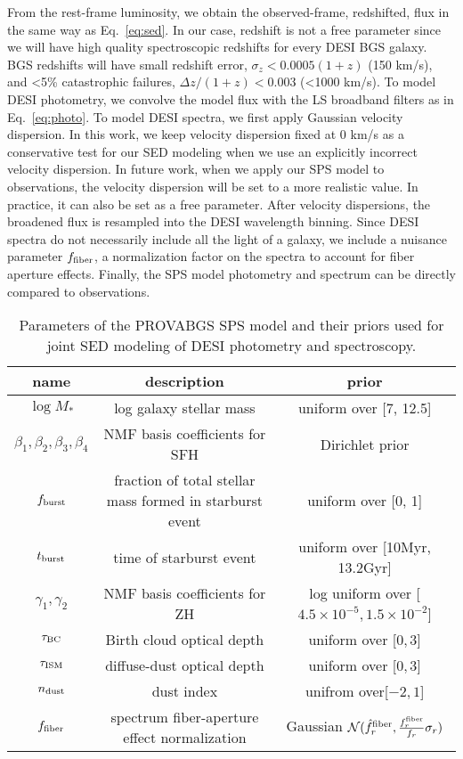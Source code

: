 From the rest-frame luminosity, we obtain the observed-frame, redshifted, flux
in the same way as Eq.~\ref{eq:sed}.
In our case, redshift is not a free parameter since we will have high quality
spectroscopic redshifts for every DESI BGS galaxy.
BGS redshifts will have small redshift error, $\sigma_z < 0.0005 (1+z)$
(150 km/s), and <5\% catastrophic failures, $\Delta z/(1+z) < 0.003$ (<1000
km/s).
To model DESI photometry, we convolve the model flux with the LS broadband
filters as in Eq.~\ref{eq:photo}.
To model DESI spectra, we first apply Gaussian velocity dispersion. 
In this work, we keep velocity dispersion fixed at 0 km/s as a conservative
test for our SED modeling when we use an explicitly incorrect velocity
dispersion.
In future work, when we apply our SPS model to observations, the velocity
dispersion will be set to a more realistic value. 
In practice, it can also be set as a free parameter.
After velocity dispersions, the broadened flux is resampled into the DESI
wavelength binning.  
Since DESI spectra do not necessarily include all the light of a galaxy, we
include a nuisance parameter $f_{\rm fiber}$, a normalization factor on the
spectra to account for fiber aperture effects. 
Finally, the SPS model photometry and spectrum can be directly compared to
observations.

\begin{table} 
\caption{Parameters of the PROVABGS SPS model and their priors used for joint
    SED modeling of DESI photometry and spectroscopy.} 
\begin{center}
    \begin{tabular}{ccc} \toprule
        name & description & prior \\[3pt]
        \hline 
        $\log M_*$                              & log galaxy stellar mass & uniform over [7, 12.5] \\
        $\beta_1, \beta_2, \beta_3, \beta_4$    & NMF basis coefficients for SFH & Dirichlet prior \\
        $f_{\rm burst}$ & fraction of total stellar mass formed in starburst event & uniform over [0, 1] \\
        $t_{\rm burst}$ & time of starburst event & uniform over [10Myr, 13.2Gyr] \\
        $\gamma_1, \gamma_2$ & NMF basis coefficients for ZH & log uniform over
        [$4.5\times10^{-5}, 1.5\times10^{-2}$] \\
        $\tau_{\rm BC}$ & Birth cloud optical depth & uniform over [$0, 3$] \\
        $\tau_{\rm ISM}$ & diffuse-dust optical depth & uniform over [$0, 3$] \\
        $n_{\rm dust}$ & \cite{calzetti2001} dust index & unifrom over[$-2, 1$]\\
        $f_{\rm fiber}$ & spectrum fiber-aperture effect normalization &
        Gaussian $\mathcal{N}(\hat{f}^{\rm fiber}_r, \frac{f^{\rm fiber}_r}{f_r} \sigma_r)$\\
        \hline            
\end{tabular} \label{tab:params}
\end{center}
\end{table}

